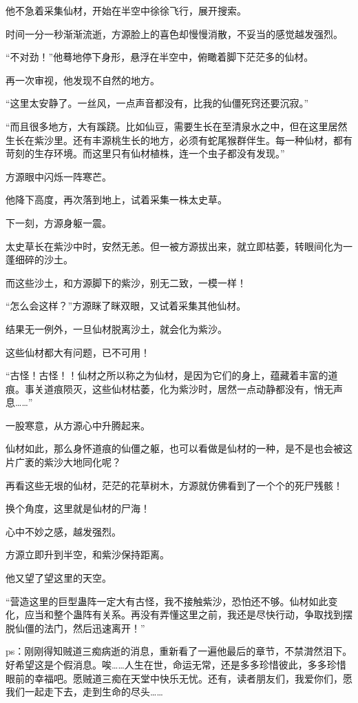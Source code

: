 \begin{this_body}
他不急着采集仙材，开始在半空中徐徐飞行，展开搜索。

时间一分一秒渐渐流逝，方源脸上的喜色却慢慢消散，不妥当的感觉越发强烈。

“不对劲！”他蓦地停下身形，悬浮在半空中，俯瞰着脚下茫茫多的仙材。

再一次审视，他发现不自然的地方。

“这里太安静了。一丝风，一点声音都没有，比我的仙僵死窍还要沉寂。”

“而且很多地方，大有蹊跷。比如仙豆，需要生长在至清泉水之中，但在这里居然生长在紫沙里。还有丰源桃生长的地方，必须有蛇尾猴群伴生。每一种仙材，都有苛刻的生存环境。而这里只有仙材植株，连一个虫子都没有发现。”

方源眼中闪烁一阵寒芒。

他降下高度，再次落到地上，试着采集一株太史草。

下一刻，方源身躯一震。

太史草长在紫沙中时，安然无恙。但一被方源拔出来，就立即枯萎，转眼间化为一蓬细碎的沙土。

而这些沙土，和方源脚下的紫沙，别无二致，一模一样！

“怎么会这样？”方源眯了眯双眼，又试着采集其他仙材。

结果无一例外，一旦仙材脱离沙土，就会化为紫沙。

这些仙材都大有问题，已不可用！

“古怪！古怪！！仙材之所以称之为仙材，是因为它们的身上，蕴藏着丰富的道痕。事关道痕陨灭，这些仙材枯萎，化为紫沙时，居然一点动静都没有，悄无声息……”

一股寒意，从方源心中升腾起来。

仙材如此，那么身怀道痕的仙僵之躯，也可以看做是仙材的一种，是不是也会被这片广袤的紫沙大地同化呢？

再看这些无垠的仙材，茫茫的花草树木，方源就仿佛看到了一个个的死尸残骸！

换个角度，这里就是仙材的尸海！

心中不妙之感，越发强烈。

方源立即升到半空，和紫沙保持距离。

他又望了望这里的天空。

“营造这里的巨型蛊阵一定大有古怪，我不接触紫沙，恐怕还不够。仙材如此变化，应当和整个蛊阵有关系。再没有弄懂这里之前，我还是尽快行动，争取找到摆脱仙僵的法门，然后迅速离开！”

ps：刚刚得知贼道三痴病逝的消息，重新看了一遍他最后的章节，不禁潸然泪下。好希望这是个假消息。唉……人生在世，命运无常，还是多多珍惜彼此，多多珍惜眼前的幸福吧。愿贼道三痴在天堂中快乐无忧。还有，读者朋友们，我爱你们，愿我们一起走下去，走到生命的尽头……

\end{this_body}

